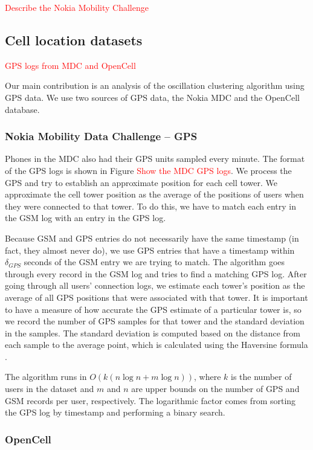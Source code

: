 \documentclass[letterpaper, 11pt, conference]{ieeeconf}
\newcommand{\xxx}[1]{\textcolor{red}{#1}}
\begin{document}
\xxx{Describe the Nokia Mobility Challenge}

\subsection{Cell location datasets}

\xxx{GPS logs from MDC and OpenCell}

Our main contribution is an analysis of the oscillation clustering algorithm using GPS data. We use two sources of GPS data, the Nokia MDC and the OpenCell database.

\subsubsection{Nokia Mobility Data Challenge -- GPS}

Phones in the MDC also had their GPS units sampled every minute. The format of the GPS logs is shown in Figure \xxx{Show the MDC GPS logs}. We process the GPS and try to establish an approximate position for each cell tower. We approximate the cell tower position as the average of the positions of users when they were connected to that tower. To do this, we have to match each entry in the GSM log with an entry in the GPS log.

Because GSM and GPS entries do not necessarily have the same timestamp (in fact, they almost never do), we use GPS entries that have a timestamp within $\delta_{GPS}$ seconds of the GSM entry we are trying to match. The algorithm goes through every record in the GSM log and tries to find a matching GPS log. After going through all users' connection logs, we estimate each tower's position as the average of all GPS positions that were associated with that tower. It is important to have a measure of how accurate the GPS estimate of a particular tower is, so we record the number of GPS samples for that tower and the standard deviation in the samples. The standard deviation is computed based on the distance from each sample to the average point, which is calculated using the Haversine formula \cite{haversine}.

The algorithm runs in $O(k(n\log n + m\log n))$, where $k$ is the number of users in the dataset and $m$ and $n$ are upper bounds on the number of GPS and GSM records per user, respectively. The logarithmic factor comes from sorting the GPS log by timestamp and performing a binary search.

\subsubsection{OpenCell}
\end{document}

